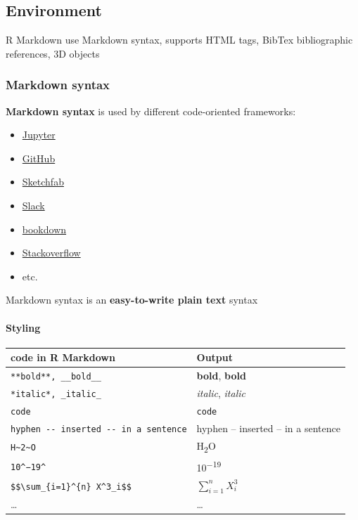 \documentclass[
]{article}
\providecommand{\tightlist}{%
  \setlength{\itemsep}{0pt}\setlength{\parskip}{0pt}}
\begin{document}
\hypertarget{environment}{%
\subsection{Environment}\label{environment}}

R Markdown use Markdown syntax, supports HTML tags, BibTex bibliographic
references, 3D objects

\hypertarget{markdown-syntax}{%
\subsubsection{Markdown syntax}\label{markdown-syntax}}

\textbf{Markdown syntax} is used by different code-oriented frameworks:

\begin{itemize}
\tightlist
\item
  \href{https://hub.mybinder.turing.ac.uk/user/ipython-ipython-in-depth-qd7itkd2/notebooks/binder/Index.ipynb}{Jupyter}
\item
  \href{https://github.com/zoometh/oxford/tree/main/R4Archaeologists\#rmarkdown}{GitHub}
\item
  \href{https://sketchfab.com/3d-models/roche-de-larcher-a5c0771d898d4816950570cd7fb1be37}{Sketchfab}
\item
  \href{https://eamena.slack.com/archives/D02KMQULWVD/p1637257246040200}{Slack}
\item
  \href{https://martinhinz.github.io/smada2021/book/preface.html}{bookdown}
\item
  \href{https://stackoverflow.com/a/14747656/2854081}{Stackoverflow}
\item
  etc.
\end{itemize}

Markdown syntax is an \textbf{easy-to-write plain text} syntax

\hypertarget{styling}{%
\paragraph{Styling}\label{styling}}

\begin{longtable}[]{@{}ll@{}}
\toprule
code in R Markdown & Output \\
\midrule
\endhead
\texttt{**bold**,\ \_\_bold\_\_} & \textbf{bold}, \textbf{bold} \\
\texttt{*italic*,\ \_italic\_} & \emph{italic}, \emph{italic} \\
\texttt{code} & \texttt{code} \\
\texttt{hyphen\ -\/-\ inserted\ -\/-\ in\ a\ sentence} & hyphen --
inserted -- in a sentence \\
\texttt{H\textasciitilde{}2\textasciitilde{}O} & H\textsubscript{2}O \\
\texttt{10\^{}−19\^{}} & 10\textsuperscript{−19} \\
\texttt{\$\$\textbackslash{}sum\_\{i=1\}\^{}\{n\}\ X\^{}3\_i\$\$} &
\(\sum_{i=1}^{n} X^3_i\) \\
\ldots{} & \ldots{} \\
\bottomrule
\end{longtable}
\end{document}
